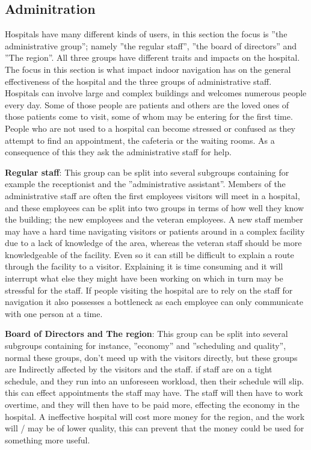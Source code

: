 \subsection{Adminitration}

Hospitals have many different kinds of users, in this section the focus is ''the administrative group''; namely ''the regular staff'', ''the board of directors'' and ''The region''. All three groups have different traits and impacts on the hospital. \\ The focus in this section is what impact indoor navigation has on the general effectiveness of the hospital and the three groups of administrative staff.\\
Hospitals can involve large and complex buildings and welcomes numerous people every day. Some of those people are patients and others are the loved ones of those patients come to visit, some of whom may be entering for the first time. People who are not used to a hospital can become stressed or confused as they attempt to find an appointment, the cafeteria or the waiting rooms. As a consequence of this they ask the administrative staff for help.

\textbf{Regular staff}: This group can be split into several subgroups containing for example the receptionist and the ''administrative assistant''. Members of the administrative staff are often the first employees visitors will meet in a hospital, and these employees can be split into two groups in terms of how well they know the building; the new employees and the veteran employees. A new staff member may have a hard time navigating visitors or patients around in a complex facility due to a lack of knowledge of the area, whereas the veteran staff should be more knowledgeable of the facility. Even so it can still be difficult to explain a route through the facility to a visitor. Explaining it is time consuming and it will interrupt what else they might have been working on which in turn may be stressful for the staff. If people visiting the hospital are to rely on the staff for navigation it also possesses a bottleneck as each employee can only communicate with one person at a time.

\textbf{Board of Directors and The region}: This group can be split into several subgroups containing for instance, ''economy'' and ''scheduling and quality'', normal these groups, don't meed up with the visitors directly, but these groups are Indirectly affected by the visitors and the staff. if staff are on a tight schedule, and they run into an unforeseen workload, then their schedule will slip. this can effect appointments the staff may have. The staff will then have to work overtime, and they will then have to be paid more, effecting the economy in the hospital. A ineffective hospital will cost more money for the region, and the work will / may be of lower quality, this can prevent that the money could be used for something more useful.

